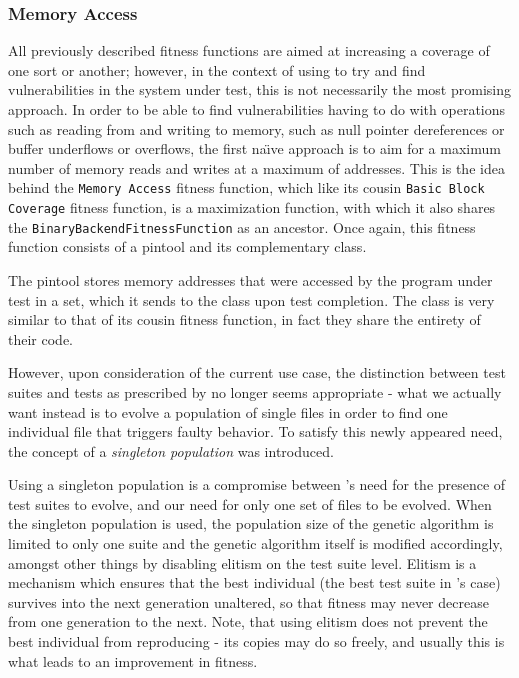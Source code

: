 \subsubsection{Memory Access}
\label{sec:memcov}
All previously described fitness functions are aimed at increasing a coverage of one sort or another; however,
in the context of using \xmlmate to try and find vulnerabilities in the system under test, this is not
necessarily the most promising approach. In order to be able to find vulnerabilities having to do with
operations such as reading from and writing to memory, such as null pointer dereferences or buffer underflows
or overflows, the first na\"\i{}ve approach is to aim for a maximum number of memory reads and writes at a
maximum of addresses. This is the idea behind the \texttt{Memory Access} fitness function, which like its
cousin \texttt{Basic Block Coverage} fitness function, is a maximization function, with which it also shares
the \texttt{BinaryBackendFitnessFunction} as an ancestor. Once again, this fitness function consists of a
pintool and its complementary \java class. 

The pintool stores memory addresses that were accessed by the program under test in a set, which it sends to
the \java class upon test completion.
The \java class is very similar to that of its cousin fitness function, in fact they share the entirety of
their code.

However, upon consideration of the current use case, the distinction between test suites and tests as
prescribed by \evosuite no longer seems appropriate - what we actually want instead is to evolve a population
of single \xml files in order to find one individual file that triggers faulty behavior. To satisfy this newly
appeared need, the concept of a \emph{singleton population} was introduced.

Using a singleton population is a compromise between \evosuite's need for the presence of test suites to
evolve, and our need for only one set of files to be evolved. When the singleton population is used, the
population size of the genetic algorithm is limited to only one suite and the genetic algorithm itself is
modified accordingly, amongst other things by disabling elitism on the test suite level. Elitism is a
mechanism which ensures that the best individual (the best test suite in \evosuite's case) survives into the
next generation unaltered, so that fitness may never decrease from one generation to the next. Note,
that using elitism does not prevent the best individual from reproducing - its copies may do so freely, and
usually this is what leads to an improvement in fitness. 

